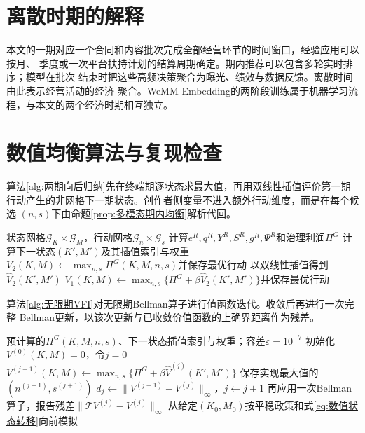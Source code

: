 \documentclass[UTF8, a4paper, 12pt, fontset=fandol]{ctexart}
\theoremstyle{definition}
\theoremstyle{remark}
\begin{document}
\begin{appendices}
\section{离散时期的解释}
本文的一期对应一个合同和内容批次完成全部经营环节的时间窗口，经验应用可以按月、
季度或一次平台扶持计划的结算周期确定。期内推荐可以包含多轮实时排序；模型在批次
结束时把这些高频决策聚合为曝光、绩效与数据反馈。离散时间由此表示经营活动的经济
聚合。WeMM-Embedding的两阶段训练属于机器学习流程，与本文的两个经济时期相互独立。

\section{数值均衡算法与复现检查}

算法\ref{alg:两期向后归纳}先在终端期逐状态求最大值，再用双线性插值评价第一期
行动产生的非网格下一期状态。创作者侧变量不进入额外行动维度，而是在每个候选
$(n,s)$下由命题\ref{prop:多模态期内均衡}解析代回。

\begin{algorithm}[H]
  \caption{两期均衡的向后归纳}
  \label{alg:两期向后归纳}
  \begin{algorithmic}[1]
    \Require 状态网格$\mathcal G_K\times\mathcal G_M$，行动网格$\mathcal G_n\times\mathcal G_s$
      \State 计算$e^R,q^R,Y^R,S^R,g^R,\Psi^R$和治理利润$\Pi^G$
      \State 计算下一状态$(K',M')$及其插值索引与权重
    \EndFor
      \State $V_2(K,M)\gets\max_{n,s}\Pi^G(K,M,n,s)$并保存最优行动
    \EndFor
      \State 以双线性插值得到$\widehat V_2(K',M')$
      \State $V_1(K,M)\gets\max_{n,s}\{\Pi^G+\beta\widehat V_2(K',M')\}$并保存最优行动
    \EndFor
  \end{algorithmic}
\end{algorithm}

算法\ref{alg:无限期VFI}对无限期Bellman算子进行值函数迭代。收敛后再进行一次完整
Bellman更新，以该次更新与已收敛价值函数的上确界距离作为残差。

\begin{algorithm}[H]
  \caption{无限期平稳马尔可夫均衡的值函数迭代}
  \label{alg:无限期VFI}
  \begin{algorithmic}[1]
    \Require 预计算的$\Pi^G(K,M,n,s)$、下一状态插值索引与权重；容差$\varepsilon=10^{-7}$
    \State 初始化$V^{(0)}(K,M)=0$，令$j=0$
    \Repeat
        \State $V^{(j+1)}(K,M)\gets\max_{n,s}\{\Pi^G+\beta\widehat V^{(j)}(K',M')\}$
        \State 保存实现最大值的$(n^{(j+1)},s^{(j+1)})$
      \EndFor
      \State $d_j\gets\lVert V^{(j+1)}-V^{(j)}\rVert_\infty$，$j\gets j+1$
    \State 再应用一次Bellman算子，报告残差$\lVert\mathcal TV^{(j)}-V^{(j)}\rVert_\infty$
    \State 从给定$(K_0,M_0)$按平稳政策和式\eqref{eq:数值状态转移}向前模拟
  \end{algorithmic}
\end{algorithm}


\end{appendices}
\end{document}
